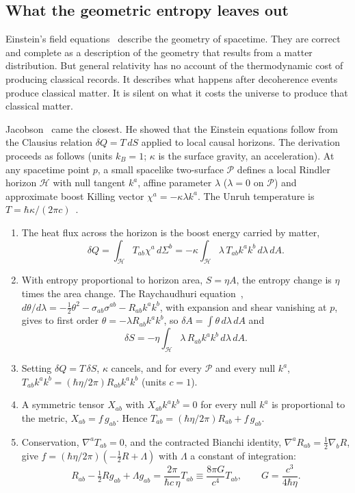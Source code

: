 \subsection{What the geometric entropy leaves out}
Einstein's field equations~\cite{Einstein1915} describe the geometry of spacetime. They are correct and complete as a description of the geometry that
results from a matter distribution. But general relativity has no account of the thermodynamic cost of producing classical records. It describes what
happens after decoherence events produce classical matter. It is silent on what it costs the universe to produce that classical matter.

Jacobson~\cite{Jacobson1995} came the closest. He showed that the Einstein equations follow from the Clausius relation $\delta Q=T\,dS$ applied to local
causal horizons. The derivation proceeds as follows (units $k_B=1$; $\kappa$ is the surface gravity, an acceleration). At any spacetime point $p$, a small
spacelike two-surface $\mathcal P$ defines a local Rindler horizon $\mathcal H$ with null tangent $k^a$, affine parameter $\lambda$ ($\lambda=0$ on
$\mathcal P$) and approximate boost Killing vector $\chi^a=-\kappa\lambda k^a$. The Unruh temperature is $T=\hbar\kappa/(2\pi c)$~\cite{Unruh1976}.
\begin{enumerate}
\item The heat flux across the horizon is the boost energy carried by matter,
\begin{equation}
\delta Q=\int_{\mathcal H}T_{ab}\chi^a\,d\Sigma^b=-\kappa\int_{\mathcal H}\lambda\,T_{ab}k^ak^b\,d\lambda\,dA. \label{eq:law_dQ}
\end{equation}
\item With entropy proportional to horizon area, $S=\eta A$, the entropy change is $\eta$ times the area change. The Raychaudhuri
equation~\cite{Raychaudhuri1955,Wald1984}, $d\theta/d\lambda=-\tfrac12\theta^2-\sigma_{ab}\sigma^{ab}-R_{ab}k^ak^b$, with expansion and shear vanishing at
$p$, gives to first order $\theta=-\lambda R_{ab}k^ak^b$, so $\delta A=\int\theta\,d\lambda\,dA$ and
\begin{equation}
\delta S=-\eta\int_{\mathcal H}\lambda\,R_{ab}k^ak^b\,d\lambda\,dA. \label{eq:law_dS}
\end{equation}
\item Setting $\delta Q=T\,\delta S$, $\kappa$ cancels, and for every $\mathcal P$ and every null $k^a$,
$T_{ab}k^ak^b=(\hbar\eta/2\pi)R_{ab}k^ak^b$ (units $c=1$).
\item A symmetric tensor $X_{ab}$ with $X_{ab}k^ak^b=0$ for every null $k^a$ is proportional to the metric, $X_{ab}=f\,g_{ab}$. Hence
$T_{ab}=(\hbar\eta/2\pi)R_{ab}+f\,g_{ab}$.
\item Conservation, $\nabla^aT_{ab}=0$, and the contracted Bianchi identity, $\nabla^aR_{ab}=\tfrac12\nabla_bR$, give
$f=(\hbar\eta/2\pi)(-\tfrac12R+\Lambda)$ with $\Lambda$ a constant of integration:
\begin{equation}
R_{ab}-\tfrac12Rg_{ab}+\Lambda g_{ab}=\frac{2\pi}{\hbar c\,\eta}T_{ab}\equiv\frac{8\pi G}{c^4}T_{ab},\qquad G=\frac{c^3}{4\hbar\eta}. \label{eq:law_jacobson}
\end{equation}
\end{enumerate}
